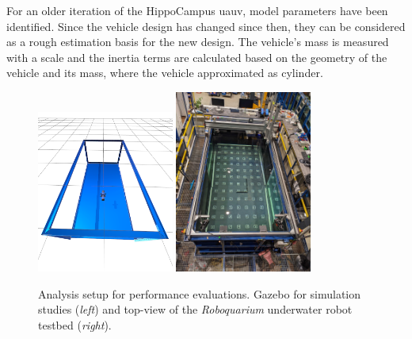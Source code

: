 For an older iteration of the HippoCampus \ac{uauv}, model parameters have been identified. Since the vehicle design has changed since then, they can be considered as a rough estimation basis for the new design. The vehicle's mass is measured with a scale and the inertia terms are calculated based on the geometry of the vehicle and its mass, where the vehicle approximated as cylinder.
\begin{figure}
    \centering
    \includegraphics[width=0.4\textwidth]{images/04/gazebo.png}
    \quad\quad
    \includegraphics[width=0.4\textwidth]{images/04/roboquarium_tested_topview.jpg}
    \caption{Analysis setup for performance evaluations. Gazebo for simulation studies (\textit{left}) and top-view of the \textit{Roboquarium} underwater robot testbed (\textit{right}).}
    \label{fig:testbed_topview}
    \label{fig:analysis_setups}
\end{figure}
